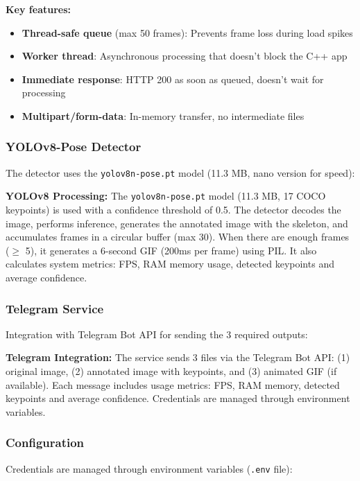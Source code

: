 \documentclass[conference]{IEEEtran}
\begin{document}
\textbf{Key features:}
\begin{itemize}
    \item \textbf{Thread-safe queue} (max 50 frames): Prevents frame loss during load spikes
    \item \textbf{Worker thread}: Asynchronous processing that doesn't block the C++ app
    \item \textbf{Immediate response}: HTTP 200 as soon as queued, doesn't wait for processing
    \item \textbf{Multipart/form-data}: In-memory transfer, no intermediate files
\end{itemize}

\subsubsection{YOLOv8-Pose Detector}

The detector uses the \texttt{yolov8n-pose.pt} model (11.3 MB, nano version for speed):

\textbf{YOLOv8 Processing:} The \texttt{yolov8n-pose.pt} model (11.3 MB, 17 COCO keypoints) is used with a confidence threshold of 0.5. The detector decodes the image, performs inference, generates the annotated image with the skeleton, and accumulates frames in a circular buffer (max 30). When there are enough frames ($\geq$ 5), it generates a 6-second GIF (200ms per frame) using PIL. It also calculates system metrics: FPS, RAM memory usage, detected keypoints and average confidence.

\subsubsection{Telegram Service}

Integration with Telegram Bot API for sending the 3 required outputs:

\textbf{Telegram Integration:} The service sends 3 files via the Telegram Bot API: (1) original image, (2) annotated image with keypoints, and (3) animated GIF (if available). Each message includes usage metrics: FPS, RAM memory, detected keypoints and average confidence. Credentials are managed through environment variables.

\subsubsection{Configuration}

Credentials are managed through environment variables (\texttt{.env} file):
\end{document}
